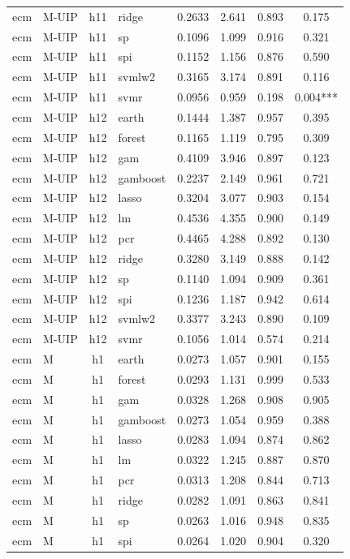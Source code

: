 \begin{ThreePartTable}
\begin{longtable}[t]{llclcccc}
ecm & M-UIP & h11 & ridge & 0.2633 & 2.641 & 0.893 & 0.175\\
ecm & M-UIP & h11 & sp & 0.1096 & 1.099 & 0.916 & 0.321\\
ecm & M-UIP & h11 & spi & 0.1152 & 1.156 & 0.876 & 0.590\\
ecm & M-UIP & h11 & svmlw2 & 0.3165 & 3.174 & 0.891 & 0.116\\
ecm & M-UIP & h11 & svmr & 0.0956 & 0.959 & 0.198 & 0.004***\\
\addlinespace
ecm & M-UIP & h12 & earth & 0.1444 & 1.387 & 0.957 & 0.395\\
ecm & M-UIP & h12 & forest & 0.1165 & 1.119 & 0.795 & 0.309\\
ecm & M-UIP & h12 & gam & 0.4109 & 3.946 & 0.897 & 0.123\\
ecm & M-UIP & h12 & gamboost & 0.2237 & 2.149 & 0.961 & 0.721\\
ecm & M-UIP & h12 & lasso & 0.3204 & 3.077 & 0.903 & 0.154\\
ecm & M-UIP & h12 & lm & 0.4536 & 4.355 & 0.900 & 0.149\\
ecm & M-UIP & h12 & pcr & 0.4465 & 4.288 & 0.892 & 0.130\\
ecm & M-UIP & h12 & ridge & 0.3280 & 3.149 & 0.888 & 0.142\\
ecm & M-UIP & h12 & sp & 0.1140 & 1.094 & 0.909 & 0.361\\
ecm & M-UIP & h12 & spi & 0.1236 & 1.187 & 0.942 & 0.614\\
ecm & M-UIP & h12 & svmlw2 & 0.3377 & 3.243 & 0.890 & 0.109\\
ecm & M-UIP & h12 & svmr & 0.1056 & 1.014 & 0.574 & 0.214\\
\addlinespace
ecm & M & h1 & earth & 0.0273 & 1.057 & 0.901 & 0.155\\
ecm & M & h1 & forest & 0.0293 & 1.131 & 0.999 & 0.533\\
ecm & M & h1 & gam & 0.0328 & 1.268 & 0.908 & 0.905\\
ecm & M & h1 & gamboost & 0.0273 & 1.054 & 0.959 & 0.388\\
ecm & M & h1 & lasso & 0.0283 & 1.094 & 0.874 & 0.862\\
ecm & M & h1 & lm & 0.0322 & 1.245 & 0.887 & 0.870\\
ecm & M & h1 & pcr & 0.0313 & 1.208 & 0.844 & 0.713\\
ecm & M & h1 & ridge & 0.0282 & 1.091 & 0.863 & 0.841\\
ecm & M & h1 & sp & 0.0263 & 1.016 & 0.948 & 0.835\\
ecm & M & h1 & spi & 0.0264 & 1.020 & 0.904 & 0.320\\

\end{longtable}
\end{ThreePartTable}
